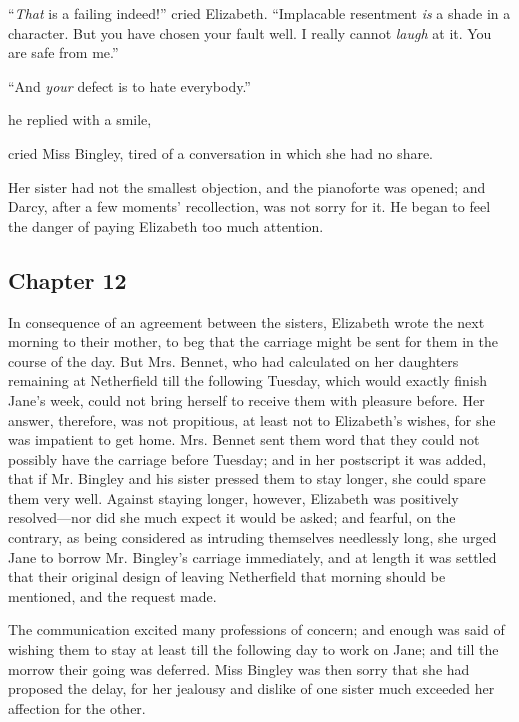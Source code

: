 “{\em That} is a failing indeed!” cried Elizabeth. “Implacable resentment {\em is} a shade in a character. But you have chosen your fault well. I really cannot {\em laugh} at it. You are safe from me.”


“And {\em your} defect is to hate everybody.”

 he replied with a smile, 

 cried Miss Bingley, tired of a conversation in which she had no share. 

Her sister had not the smallest objection, and the pianoforte was opened; and Darcy, after a few moments' recollection, was not sorry for it. He began to feel the danger of paying Elizabeth too much attention.

\subsection[chapter-12]{\useURL[url12][][][]\from[url12] Chapter 12}

In consequence of an agreement between the sisters, Elizabeth wrote the next morning to their mother, to beg that the carriage might be sent for them in the course of the day. But Mrs. Bennet, who had calculated on her daughters remaining at Netherfield till the following Tuesday, which would exactly finish Jane's week, could not bring herself to receive them with pleasure before. Her answer, therefore, was not propitious, at least not to Elizabeth's wishes, for she was impatient to get home. Mrs. Bennet sent them word that they could not possibly have the carriage before Tuesday; and in her postscript it was added, that if Mr. Bingley and his sister pressed them to stay longer, she could spare them very well. Against staying longer, however, Elizabeth was positively resolved---nor did she much expect it would be asked; and fearful, on the contrary, as being considered as intruding themselves needlessly long, she urged Jane to borrow Mr. Bingley's carriage immediately, and at length it was settled that their original design of leaving Netherfield that morning should be mentioned, and the request made.

The communication excited many professions of concern; and enough was said of wishing them to stay at least till the following day to work on Jane; and till the morrow their going was deferred. Miss Bingley was then sorry that she had proposed the delay, for her jealousy and dislike of one sister much exceeded her affection for the other.

